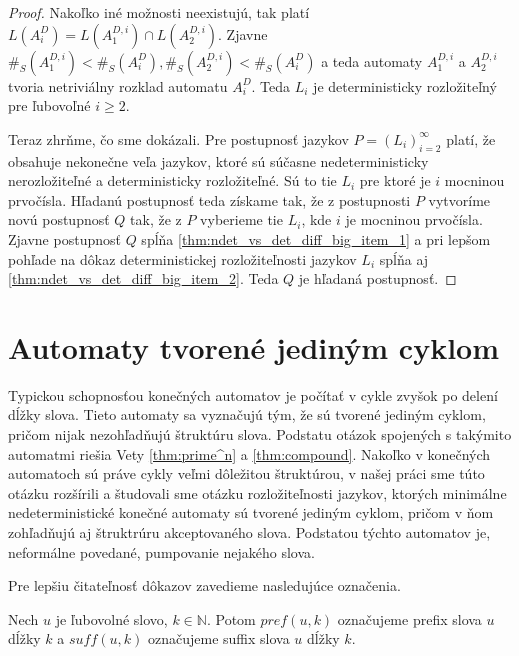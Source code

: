 \begin{proof}
Nakoľko iné možnosti neexistujú, tak platí $ L(A_i^D) = L(A_1^{D,i}) \cap L(A_2^{D,i}) $. Zjavne $ \#_S(A_1^{D,i}) < \#_S(A_i^D), \#_S(A_2^{D,i}) < \#_S(A_i^D) $ a teda automaty $ A_1^{D,i} $ a $ A_2^{D,i} $ tvoria netriviálny rozklad automatu $ A_i^D $. Teda $ L_i $ je deterministicky rozložiteľný pre ľubovoľné $ i \geq 2 $.
\par
Teraz zhrňme, čo sme dokázali. Pre postupnosť jazykov $ P=(L_i)_{i=2}^{\infty} $ platí, že obsahuje nekonečne veľa jazykov, ktoré sú súčasne nedeterministicky nerozložiteľné a deterministicky rozložiteľné. Sú to tie $ L_i $ pre ktoré je $ i $ mocninou prvočísla. Hľadanú postupnosť teda získame tak, že z postupnosti $ P $ vytvoríme novú postupnosť $ Q $ tak, že z $ P $ vyberieme tie $ L_i $, kde $ i $ je mocninou prvočísla. Zjavne postupnosť $ Q $ spĺňa \ref{thm:ndet_vs_det_diff_big_item_1} a pri lepšom pohľade na dôkaz deterministickej rozložiteľnosti jazykov $ L_i $ spĺňa aj \ref{thm:ndet_vs_det_diff_big_item_2}. Teda $ Q $ je hľadaná postupnosť.

\end{proof}

\section{Automaty tvorené jediným cyklom}

Typickou schopnosťou konečných automatov je počítať v cykle zvyšok po delení dĺžky slova. Tieto automaty sa vyznačujú tým, že sú tvorené jediným cyklom, pričom nijak nezohľadňujú štruktúru slova. Podstatu otázok spojených s takýmito automatmi riešia Vety \ref{thm:prime^n} a \ref{thm:compound}. Nakoľko v konečných automatoch sú práve cykly veľmi dôležitou štruktúrou, v našej práci sme túto otázku rozšírili a študovali sme otázku rozložiteľnosti jazykov, ktorých minimálne nedeterministické konečné automaty sú tvorené jediným cyklom, pričom v ňom zohľadňujú aj štruktrúru akceptovaného slova. Podstatou týchto automatov je, neformálne povedané, pumpovanie nejakého slova.
\par
Pre lepšiu čitateľnosť dôkazov zavedieme nasledujúce označenia.

\begin{notation}
\normalfont
Nech $ u $ je ľubovolné slovo, $ k \in \mathbb{N} $. Potom $ pref(u,k) $ označujeme prefix slova $ u $ dĺžky $ k $ a $ suff(u,k) $ označujeme suffix slova $ u $ dĺžky $ k $.
\end{notation}

